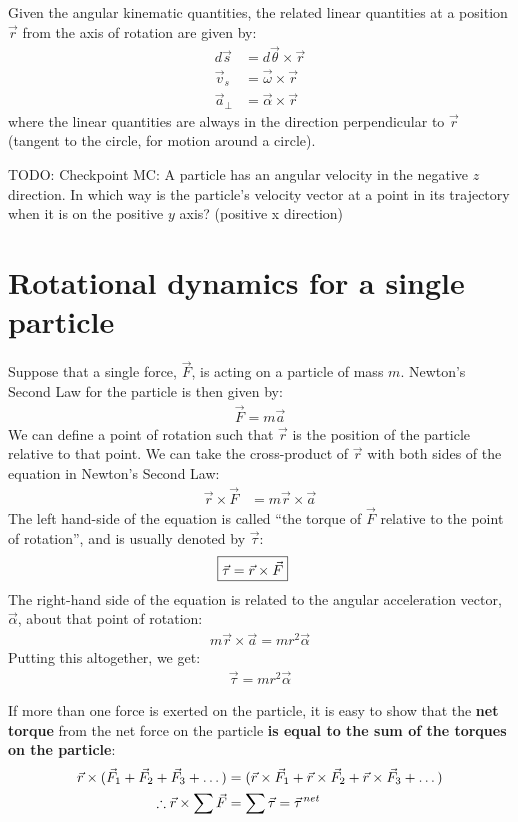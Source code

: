 Given the angular kinematic quantities, the related linear quantities at a position $\vec r$ from the axis of rotation are given by:
\begin{align}
d\vec s &= d\vec\theta \times \vec r\nonumber\\
\vec v_s &= \vec \omega \times \vec r\nonumber\\
\vec a_\perp&= \vec \alpha \times \vec r
\end{align}
where the linear quantities are always in the direction perpendicular to $\vec r$ (tangent to the circle, for motion around a circle). 

TODO: Checkpoint MC: A particle has an angular velocity in the negative $z$ direction. In which way is the particle's velocity vector at a point in its trajectory when it is on the positive $y$ axis? (positive x direction)

\section{Rotational dynamics for a single particle}
Suppose that a single force, $\vec F$, is acting on a particle of mass $m$.  Newton's Second Law for the particle is then given by:
\begin{align*}
\vec F = m \vec a
\end{align*}
We can define a point of rotation such that $\vec r$ is the position of the particle relative to that point. We can take the cross-product of $\vec r$ with both sides of the equation in Newton's Second Law:
\begin{align*}
\vec r \times \vec F &= m \vec r \times \vec a
\end{align*}
The left hand-side of the equation is called ``the torque of $\vec F$ relative to the point of rotation'', and is usually denoted by $\vec \tau$:
\begin{align}
\Aboxed{\vec \tau = \vec r \times \vec F}
\end{align}
The right-hand side of the equation is related to the angular acceleration vector, $\vec \alpha$, about that point of rotation:
\begin{align*}
 m \vec r \times \vec a = mr^2\vec\alpha
\end{align*}
Putting this altogether, we get:
\begin{align*}
\vec\tau = mr^2 \vec\alpha
\end{align*}

If more than one force is exerted on the particle, it is easy to show that the \textbf{net torque} from the net force on the particle \textbf{is equal to the sum of the torques on the particle}:
\begin{align*}
\vec r \times (\vec F_1 + \vec F_2 + \vec F_3 + \dots) &=  (\vec r \times \vec F_1 + \vec r \times \vec F_2 + \vec r \times \vec F_3 + \dots) \\
\therefore \vec r \times \sum \vec F &= \sum \vec \tau = \pvec \tau^{net}
\end{align*}

